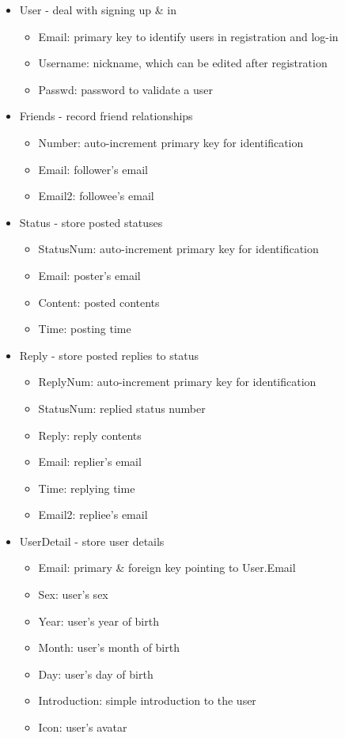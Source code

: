\begin{itemize}
	\item User - deal with signing up \& in
		\begin{itemize}
			\item Email: primary key to identify users in registration and log-in
			\item Username: nickname, which can be edited after registration
			\item Passwd: password to validate a user
		\end{itemize}
	\item Friends - record friend relationships
		\begin{itemize}
			\item Number: auto-increment primary key for identification
			\item Email: follower's email
			\item Email2: followee's email
		\end{itemize}
	\item Status - store posted statuses
		\begin{itemize}
			\item StatusNum: auto-increment primary key for identification
			\item Email: poster's email
			\item Content: posted contents
			\item Time: posting time
		\end{itemize}
	\item Reply - store posted replies to status
		\begin{itemize}
			\item ReplyNum: auto-increment primary key for identification
			\item StatusNum: replied status number
			\item Reply: reply contents
			\item Email: replier's email
			\item Time: replying time
			\item Email2: repliee's email
		\end{itemize}
	\item UserDetail - store user details
		\begin{itemize}
			\item Email: primary \& foreign key pointing to User.Email
			\item Sex: user's sex
			\item Year: user's year of birth
			\item Month: user's month of birth
			\item Day: user's day of birth
			\item Introduction: simple introduction to the user
			\item Icon: user's avatar
		\end{itemize}
\end{itemize}
